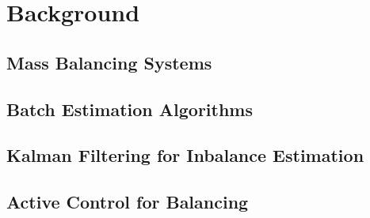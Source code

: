 \chapter{Background}

\section{Mass Balancing Systems}

\section{Batch Estimation Algorithms}

\section{Kalman Filtering for Inbalance Estimation}

\section{Active Control for Balancing}